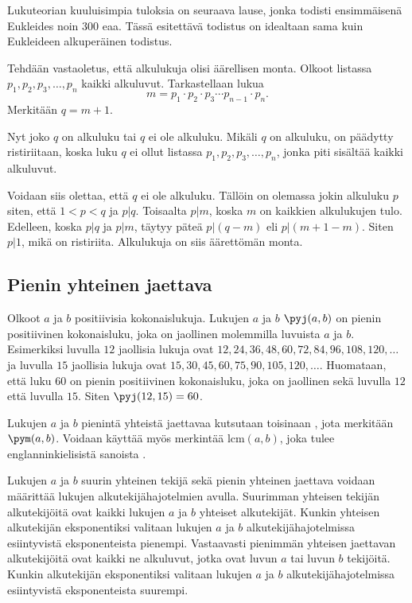 Lukuteorian kuuluisimpia tuloksia on seuraava lause, jonka todisti ensimmäisenä Eukleides noin 300 eaa. Tässä esitettävä todistus on idealtaan sama kuin Eukleideen alkuperäinen todistus.


\begin{todistus}
Tehdään vastaoletus, että alkulukuja olisi äärellisen monta. Olkoot listassa
$p_1,p_2,p_3,\ldots,p_n$ kaikki alkuluvut. Tarkastellaan lukua
\[
m = p_1\cdot p_2\cdot p_3 \cdots p_{n-1}\cdot p_n.
\]
Merkitään $q=m+1$.

Nyt joko $q$ on alkuluku tai $q$ ei ole alkuluku. Mikäli $q$ on alkuluku, on päädytty ristiriitaan, koska luku $q$ ei ollut listassa $p_1,p_2,p_3,\ldots,p_n$, jonka piti sisältää kaikki alkuluvut.

Voidaan siis olettaa, että $q$ ei ole alkuluku. Tällöin on olemassa jokin alkuluku $p$ siten, että $1<p<q$ ja $p|q$. Toisaalta $p|m$, koska $m$ on kaikkien alkulukujen tulo. Edelleen, koska $p|q$ ja $p|m$, täytyy päteä $p|(q-m)$ eli $p|(m+1-m)$. Siten $p|1$, mikä on ristiriita. Alkulukuja on siis äärettömän monta.
\end{todistus}


\subsection*{Pienin yhteinen jaettava}
Olkoot $a$ ja $b$ positiivisia kokonaislukuja. Lukujen $a$ ja $b$  $\pyj(a,b)$ on pienin positiivinen kokonaisluku, joka on jaollinen molemmilla luvuista $a$ ja $b$. Esimerkiksi luvulla $12$ jaollisia lukuja ovat $12, 24, 36, 48, 60, 72, 84, 96, 108, 120, \ldots$ ja luvulla $15$ jaollisia lukuja ovat $15, 30, 45, 60, 75, 90, 105, 120, \ldots$. Huomataan, että luku $60$ on pienin positiivinen kokonaisluku, joka on jaollinen sekä luvulla $12$ että luvulla $15$. Siten $\pyj(12, 15) = 60$.

Lukujen $a$ ja $b$ pienintä yhteistä jaettavaa kutsutaan toisinaan , jota merkitään $\pym(a,b)$. Voidaan käyttää myös merkintää $\mathrm{lcm}(a,b)$, joka tulee englanninkielisistä sanoista .

Lukujen $a$ ja $b$ suurin yhteinen tekijä sekä pienin yhteinen jaettava voidaan määrittää lukujen alkutekijähajotelmien avulla. Suurimman yhteisen tekijän alkutekijöitä ovat kaikki lukujen $a$ ja $b$ yhteiset alkutekijät. Kunkin yhteisen alkutekijän eksponentiksi valitaan lukujen $a$ ja $b$ alkutekijähajotelmissa esiintyvistä eksponenteista pienempi. Vastaavasti pienimmän yhteisen jaettavan alkutekijöitä ovat kaikki ne alkuluvut, jotka ovat luvun $a$ tai luvun $b$ tekijöitä. Kunkin alkutekijän eksponentiksi valitaan lukujen $a$ ja $b$ alkutekijähajotelmissa esiintyvistä eksponenteista suurempi.

